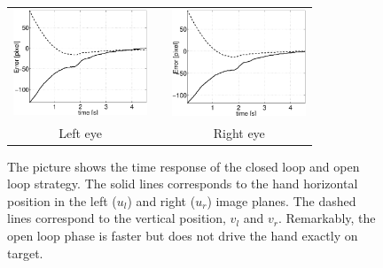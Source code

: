   \begin{figure}
  \begin{center}
	\begin{tabular}{ccc}
	  \parbox{50mm}{\includegraphics[width=40mm]{Figure/LeftEyeOpenClosedLoopTimeResponse.eps}}  & \hspace{2cm} &
	  \parbox{50mm}{\includegraphics[width=40mm]{Figure/RightEyeOpenClosedLoopTimeResponse.eps}}
	  \\
	  \parbox{50mm}{\centering Left eye } & \hspace{2cm} & \parbox{50mm}{\centering Right eye }
  \end{tabular}
\end{center}
\caption{The picture shows the time response of the closed loop and open loop strategy. The solid lines corresponds to the hand horizontal position in the left ($u_l$) and right ($u_r$) image planes. The dashed lines correspond to the vertical position, $v_l$ and $v_r$. Remarkably, the open loop phase is faster but does not drive the hand exactly on target.  }\label{Fig:TimeResponseOpenClosedLoop}
  \end{figure}